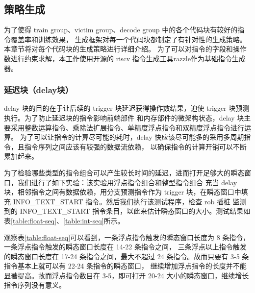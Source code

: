 \subsection{策略生成}

为了使得 train group、victim group、decode group 中的各个代码块有较好的指令覆盖率和训练效果，
生成框架对每一个代码块都制定了有针对性的生成策略。本章节将对每个代码块的生成策略进行详细介绍。
为了可以对指令的字段和操作数进行约束求解，本工作使用开源的 riscv 指令生成工具razzle\cite{razzle}作为基础指令生成器。

\subsubsection{延迟块（delay块）}
delay 块的目的在于让后续的 trigger 块延迟获得操作数结果，迫使 trigger 块预测执行。为了防止延迟块的指令影响前端部件
和内存部件的微架构状态，delay 块主要采用整数运算指令、乘除法扩展指令、单精度浮点指令和双精度浮点指令进行运算。
为了可以让指令的计算尽可能的耗时，delay 快应该尽可能多的采用多周期指令，且指令序列之间应该有较强的数据流依赖，
以确保指令的计算开销可以不断累加起来。\par

为了检验哪些类型的指令组合可以产生较长时间的延迟，进而打开足够大的瞬态窗口，我们进行了如下实验：该实验用浮点指令组合和整型指令组合
充当 delay 块，相邻指令之间有数据依赖，用分支预测指令作为 trigger 块，在瞬态窗口中填充 INFO\_TEXT\_START 指令。然后我们执行该测试程序，检查 rob 插桩
监测到的 INFO\_TEXT\_START 指令条目，以此来估计瞬态窗口的大小。测试结果如表\ref{table:float-seq}、\ref{table:int-seq}所示。\par

观察表\ref{table:float-seq}可以看到，一条浮点指令触发的瞬态窗口长度为 8 条指令，一条浮点指令触发的瞬态窗口长度在 14-22 条指令之间，
三条浮点以上指令触发的瞬态窗口长度在 17-24 条指令之间，最大不超过 24 条指令。故而只要有 3-5 条指令基本上就可以有 22-24 条指令的瞬态窗口，
继续增加浮点指令的长度并不能显著提高。故而浮点指令数目在 3-5，即可打开 20-24 大小的瞬态窗口，继续增长指令序列没有意义。\par

